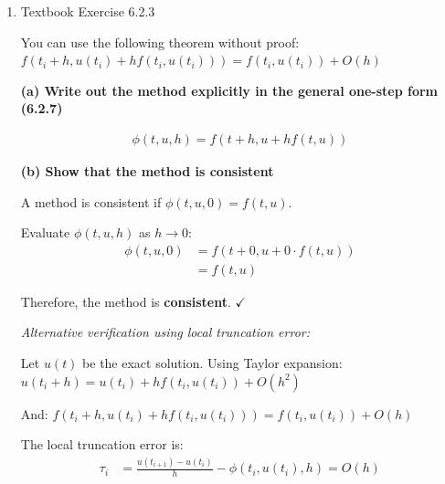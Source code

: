 \documentclass[reqno, answers]{exam}
\begin{document}
\begin{enumerate}
\begin{solution}
          Error: $|u_2 - \hat{u}(0.4)| \approx 0.1555$

          \medskip

          \textbf{(c) $tu' + u = 1$, $u(1) = 6$, $h = 0.25$; $\hat{u}(t) = 1 + 5/t$}

          $u_1 = 4.75$

          $u_2 = 4.0$

          Error: $|u_2 - \hat{u}(1.5)| \approx 0.3333$

        \end{solution}


  \item Textbook Exercise 6.2.3

        You can use the following theorem without proof: $f(t_i + h, u(t_i) + h f(t_i, u(t_i))) = f(t_i, u(t_i)) + O(h)$
        \begin{solution}
          \textbf{(a) Write out the method explicitly in the general one-step form (6.2.7)}

          \begin{align*}
            \boxed{\phi(t, u, h) = f(t + h, u + h f(t, u))}
          \end{align*}

          \medskip

          \textbf{(b) Show that the method is consistent}

          A method is consistent if $\phi(t, u, 0) = f(t, u)$.

          Evaluate $\phi(t, u, h)$ as $h \to 0$:
          \begin{align*}
            \phi(t, u, 0) & = f(t + 0, u + 0 \cdot f(t, u)) \\
                          & = f(t, u)
          \end{align*}

          Therefore, the method is \textbf{consistent}. $\checkmark$

          \textit{Alternative verification using local truncation error:}

          Let $u(t)$ be the exact solution. Using Taylor expansion: $u(t_i + h) = u(t_i) + h f(t_i, u(t_i)) + O(h^2)$

          And: $f(t_i + h, u(t_i) + h f(t_i, u(t_i))) = f(t_i, u(t_i)) + O(h)$

          The local truncation error is:
          \begin{align*}
            \tau_i & = \frac{u(t_{i+1}) - u(t_i)}{h} - \phi(t_i, u(t_i), h) = O(h)
          \end{align*}


\end{solution}
\end{enumerate}
\end{document}
